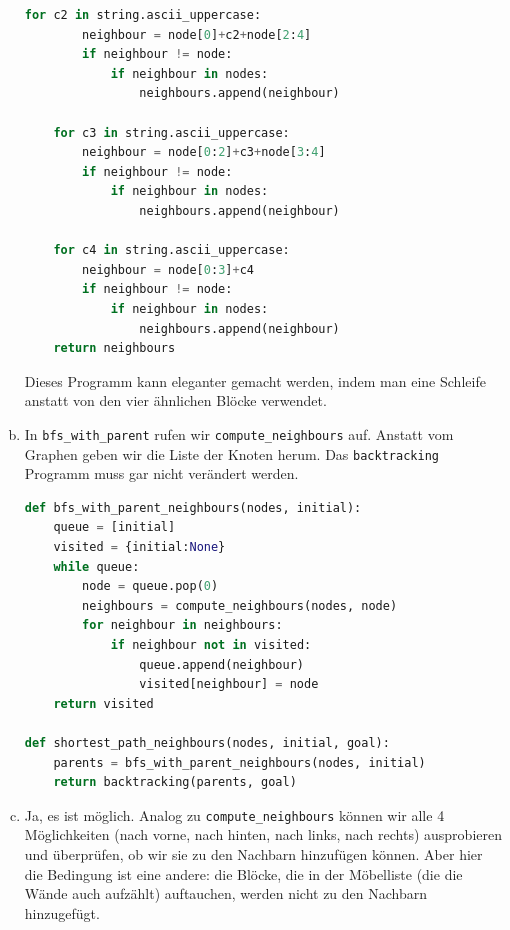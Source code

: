 \begin{enumerate}[(a)]
\begin{lstlisting}[language=Python]
    for c2 in string.ascii_uppercase:
        neighbour = node[0]+c2+node[2:4]
        if neighbour != node:
            if neighbour in nodes:
                neighbours.append(neighbour)
    
    for c3 in string.ascii_uppercase:
        neighbour = node[0:2]+c3+node[3:4]
        if neighbour != node:
            if neighbour in nodes:
                neighbours.append(neighbour)
                
    for c4 in string.ascii_uppercase:
        neighbour = node[0:3]+c4
        if neighbour != node:
            if neighbour in nodes:
                neighbours.append(neighbour)
    return neighbours
    \end{lstlisting}
    Dieses Programm kann eleganter gemacht werden, indem man eine Schleife anstatt von den vier ähnlichen Blöcke verwendet.
    
    \item In \texttt{bfs\_with\_parent} rufen wir \texttt{compute\_neighbours} auf. Anstatt vom Graphen geben wir die Liste der Knoten herum. Das \texttt{backtracking} Programm muss gar nicht verändert werden.
    \begin{lstlisting}[language=Python]
    def bfs_with_parent_neighbours(nodes, initial):
    queue = [initial]
    visited = {initial:None}
    while queue:
        node = queue.pop(0)
        neighbours = compute_neighbours(nodes, node)
        for neighbour in neighbours:
            if neighbour not in visited:
                queue.append(neighbour)
                visited[neighbour] = node
    return visited
    
def shortest_path_neighbours(nodes, initial, goal):
    parents = bfs_with_parent_neighbours(nodes, initial)
    return backtracking(parents, goal)
    \end{lstlisting}
    
    \item Ja, es ist möglich. Analog zu \texttt{compute\_neighbours} können wir alle 4 Möglichkeiten (nach vorne, nach hinten, nach links, nach rechts) ausprobieren und überprüfen, ob wir sie zu den Nachbarn hinzufügen können. Aber hier die Bedingung ist eine andere: die Blöcke, die in der Möbelliste (die die Wände auch aufzählt) auftauchen, werden nicht zu den Nachbarn hinzugefügt.
    
    \end{enumerate}

